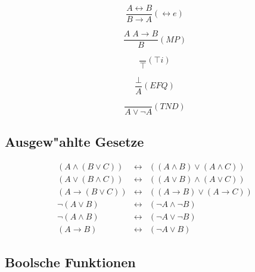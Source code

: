 \documentclass[11pt, a4paper,twocolumn]{scrartcl}
\begin{document}
\begin{minipage}{3.8cm}
\begin{displaymath}\frac{A \leftrightarrow B}{B \rightarrow A}(\leftrightarrow e)\end{displaymath}
\end{minipage}
\begin{minipage}{3.8cm}
\begin{displaymath}\frac{A \; A \rightarrow B}{B}(MP)\end{displaymath}
\end{minipage}
\begin{minipage}{3.8cm}
\begin{displaymath}\frac{}{\top}(\top i)\end{displaymath}
\end{minipage}
\begin{minipage}{3.8cm}
\begin{displaymath}\frac{\bot}{A}(EFQ)\end{displaymath}
\end{minipage}
\begin{minipage}{3.8cm}
\begin{displaymath}\frac{}{A \lor \lnot A}(TND)\end{displaymath}
\end{minipage}

\subsection{Ausgew"ahlte Gesetze}
\begin{eqnarray*}
 (A \land (B \lor C)) & \leftrightarrow & ((A \land B) \lor (A \land C)) \\
 (A \lor (B \land C)) & \leftrightarrow & ((A \lor B) \land (A \lor C)) \\
 (A \rightarrow (B \lor C)) & \leftrightarrow & ((A \rightarrow B) \lor (A \rightarrow C)) \\
\lnot (A \lor B) & \leftrightarrow & (\lnot A \land \lnot B)\\
 \lnot (A \land B) & \leftrightarrow & (\lnot A \lor \lnot B)\\
 (A \rightarrow B) & \leftrightarrow & (\lnot A \lor B)
\end{eqnarray*}

\subsection{Boolsche Funktionen}
\end{document}
